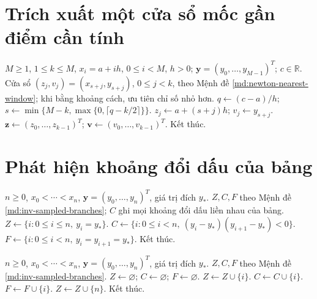 \documentclass[12pt,a4paper,oneside]{book}
\numberwithin{algorithm}{chapter}
\theoremstyle{definition}
\newcommand{\R}{\mathbb{R}}
\begin{document}
\section{Trích xuất một cửa sổ mốc gần điểm cần tính}
\begin{algorithm}[H]
\caption{Lấy $k$ mốc gần nhất trên lưới đều}
\label{alg:newton-nearest-window}
\begin{algorithmic}[1]
\Require $M\geq1$, $1\leq k\leq M$, $x_i=a+ih$, $0\leq i<M$, $h>0$; $\boldsymbol y=(y_0,\ldots,y_{M-1})^T$; $c\in\R$.
\Ensure Cửa sổ $(z_j,v_j)=(x_{s+j},y_{s+j})$, $0\leq j<k$, theo Mệnh đề \ref{md:newton-nearest-window}; khi bằng khoảng cách, ưu tiên chỉ số nhỏ hơn.
\State $q\gets(c-a)/h$; $s\gets\min\{M-k,\max\{0,\lceil q-k/2\rceil\}\}$.
  \State $z_j\gets a+(s+j)h$; $v_j\gets y_{s+j}$.
\EndFor
\Statex
\State $\boldsymbol z\gets(z_0,\ldots,z_{k-1})^T$; $\boldsymbol v\gets(v_0,\ldots,v_{k-1})^T$.
\State Kết thúc.
\end{algorithmic}
\end{algorithm}

\section{Phát hiện khoảng đổi dấu của bảng}
\begin{algorithm}[H]
\caption{Nghiệm tại mốc, khoảng đổi dấu và đoạn hằng -- sơ lược}
\label{alg:inv-sign-scan}
\begin{algorithmic}[1]
\Require $n\geq0$, $x_0<\cdots<x_n$, $\boldsymbol y=(y_0,\ldots,y_n)^T$, giá trị đích $y_\ast$.
\Ensure $Z,C,F$ theo Mệnh đề \ref{md:inv-sampled-branches}; $C$ ghi mọi khoảng đổi dấu liền nhau của bảng.
\State $Z\gets\{i:0\leq i\leq n,\ y_i=y_\ast\}$.
\State $C\gets\{i:0\leq i<n,\ (y_i-y_\ast)(y_{i+1}-y_\ast)<0\}$.
\State $F\gets\{i:0\leq i<n,\ y_i=y_{i+1}=y_\ast\}$.
\State Kết thúc.
\end{algorithmic}
\end{algorithm}

\begin{algorithm}[H]
\caption{Nghiệm tại mốc, khoảng đổi dấu và đoạn hằng -- chi tiết}
\label{alg:inv-sign-scan-detailed}
\begin{algorithmic}[1]
\Require $n\geq0$, $x_0<\cdots<x_n$, $\boldsymbol y=(y_0,\ldots,y_n)^T$, giá trị đích $y_\ast$.
\Ensure $Z,C,F$ theo Mệnh đề \ref{md:inv-sampled-branches}.
\State $Z\gets\varnothing$; $C\gets\varnothing$; $F\gets\varnothing$.
    \State $Z\gets Z\cup\{i\}$.
  \EndIf
  \Statex
    \State $C\gets C\cup\{i\}$.
  \EndIf
  \Statex
    \State $F\gets F\cup\{i\}$.
  \EndIf
  \Statex
\EndFor
\Statex
{}
  \State $Z\gets Z\cup\{n\}$.
\EndIf
\Statex
\State Kết thúc.
\end{algorithmic}
\end{algorithm}
\end{document}

